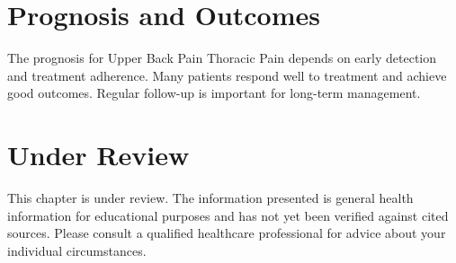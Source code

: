 \section*{Prognosis and Outcomes}
The prognosis for Upper Back Pain Thoracic Pain depends on early detection and treatment adherence. Many patients respond well to treatment and achieve good outcomes. Regular follow-up is important for long-term management.
\section*{Under Review}
This chapter is under review. The information presented is general health information for educational purposes and has not yet been verified against cited sources. Please consult a qualified healthcare professional for advice about your individual circumstances.


\clearpage
